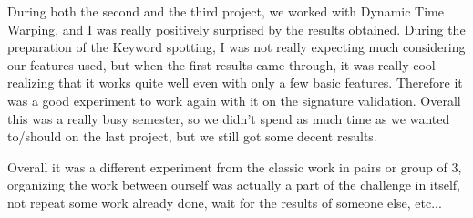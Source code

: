 \documentclass{homework}
\begin{document}
During both the second and the third project, we worked with Dynamic Time Warping, and I was really positively surprised by the results obtained. During the preparation of the Keyword spotting, I was not really expecting much considering our features used, but when the first results came through, it was really cool realizing that it works quite well even with only a few basic features. Therefore it was a good experiment to work again with it on the signature validation. Overall this was a really busy semester, so we didn't spend as much time as we wanted to/should on the last project, but we still got some decent results.

Overall it was a different experiment from the classic work in pairs or group of 3, organizing the work between ourself was actually a part of the challenge in itself, not repeat some work already done, wait for the results of someone else, etc... 
\end{document}
